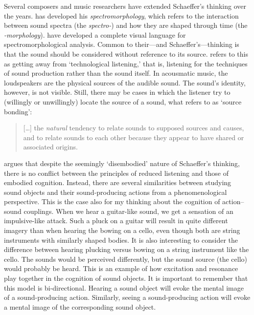 Several composers and music researchers have extended Schaeffer's thinking over the years. \citet{smalley_spectromorphology_1997} has developed his \emph{spectromorphology}, which refers to the interaction between sound spectra (the \emph{spectro-}) and how they are shaped through time (the \emph{-morphology}). \citet{thoresen_Emergent_2015} have developed a complete visual language for spectromorphological analysis. Common to their---and Schaeffer's---thinking is that the sound should be considered without reference to its source. \citet{smalley_spectromorphology_1997} refers to this as getting away from `technological listening,' that is, listening for the techniques of sound production rather than the sound itself. In acousmatic music, the loudspeakers are the physical sources of the audible sound. The sound's identity, however, is not visible. Still, there may be cases in which the listener try to (willingly or unwillingly) locate the source of a sound, what \citet[p.110]{smalley_spectromorphology_1997} refers to as `source bonding':

\begin{quotation}
   [\ldots] the \emph{natural} tendency to relate sounds to supposed sources and causes, and to relate sounds to each other because they appear to have shared or associated origins.
\end{quotation}

\citet{godoy_gestural-sonorous_2006} argues that despite the seemingly `disembodied' nature of Schaeffer's thinking, there is no conflict between the principles of reduced listening and those of embodied cognition. Instead, there are several similarities between studying sound objects and their sound-producing actions from a phenomenological perspective. This is the case also for my thinking about the cognition of action--sound couplings. When we hear a guitar-like sound, we get a sensation of an impulsive-like attack. Such a pluck on a guitar will result in quite different imagery than when hearing the bowing on a cello, even though both are string instruments with similarly shaped bodies. It is also interesting to consider the difference between hearing plucking versus bowing on a string instrument like the cello. The sounds would be perceived differently, but the sound source (the cello) would probably be heard. This is an example of how excitation and resonance play together in the cognition of sound objects. It is important to remember that this model is bi-directional. Hearing a sound object will evoke the mental image of a sound-producing action. Similarly, seeing a sound-producing action will evoke a mental image of the corresponding sound object.

